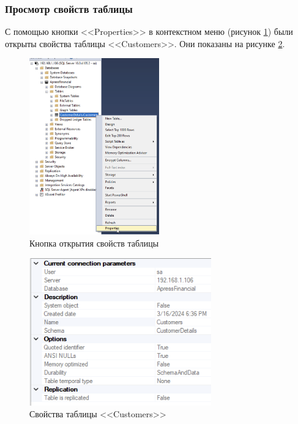 \documentclass[a4paper, 14pt]{extarticle}
\begin{document}
\subsubsection{Просмотр свойств таблицы}

С помощью кнопки <<Properties>> в контекстном меню (рисунок \ref{fig:task-1-11})
были открыты свойства таблицы <<Customers>>. Они показаны на рисунке
\ref{fig:task-1-12}.

\begin{figure}[H]
  \centering
  \includegraphics[width=0.5\textwidth]{images/task-1/11.png}
  \caption{Кнопка открытия свойств таблицы}
  \label{fig:task-1-11}
\end{figure}

\begin{figure}[H]
  \centering
  \includegraphics[width=0.7\textwidth]{images/task-1/12.png}
  \caption{Свойства таблицы <<Customers>>}
  \label{fig:task-1-12}
\end{figure}
\end{document}

